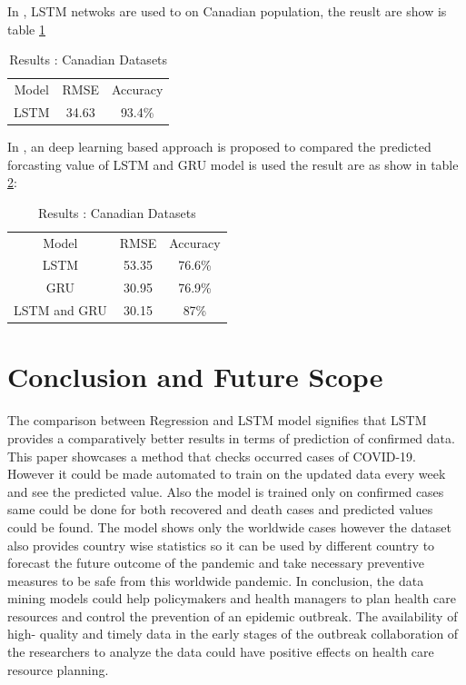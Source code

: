 In \cite{chimmula2020time}, LSTM netwoks are used to on Canadian population,
the reuslt are show is table \ref{table:four}

\begin{table}[ht!]
	\centering
	\caption{Results \cite{chimmula2020time}: Canadian Datasets}
	\begin{tabular}{c c c}
		Model & RMSE & Accuracy \\
		LSTM & 34.63 & 93.4\%

	\end{tabular}
	\label{table:four}
\end{table}


In \cite{bandyopadhyay2020machine}, an deep learning based approach is
proposed to compared the predicted forcasting value of LSTM and GRU model is
used the result are as show in table \ref{table:seven}:

\begin{table}[ht!]
	\centering
	\caption{Results \cite{chimmula2020time}: Canadian Datasets}
	\begin{tabular}{c c c}
		Model & RMSE & Accuracy \\
		LSTM & 53.35 & 76.6\% \\
		GRU & 30.95 & 76.9\% \\
		LSTM and GRU & 30.15 & 87\%

	\end{tabular}
	\label{table:seven}
\end{table}

\section{Conclusion and Future Scope}

The comparison between Regression and LSTM model signifies that LSTM provides a
comparatively better results in terms of prediction of confirmed data. This paper showcases a method that checks occurred cases of
COVID-19. However it could be made automated to train on the updated data
every week and see the predicted value. Also the model is trained only on confirmed cases
same could be done for both recovered and death cases and predicted values could be found.
The model shows only the worldwide cases however the dataset also provides country wise
statistics so it can be used by different country to forecast the future outcome of the
pandemic and take necessary preventive measures to be safe from this worldwide
pandemic.  In conclusion,
the data mining models could help policymakers and health managers to plan health care
resources and control the prevention of an epidemic outbreak. The availability of high-
quality and timely data in the early stages of the outbreak collaboration of
the researchers to analyze the data could have positive effects on health care
resource planning.

